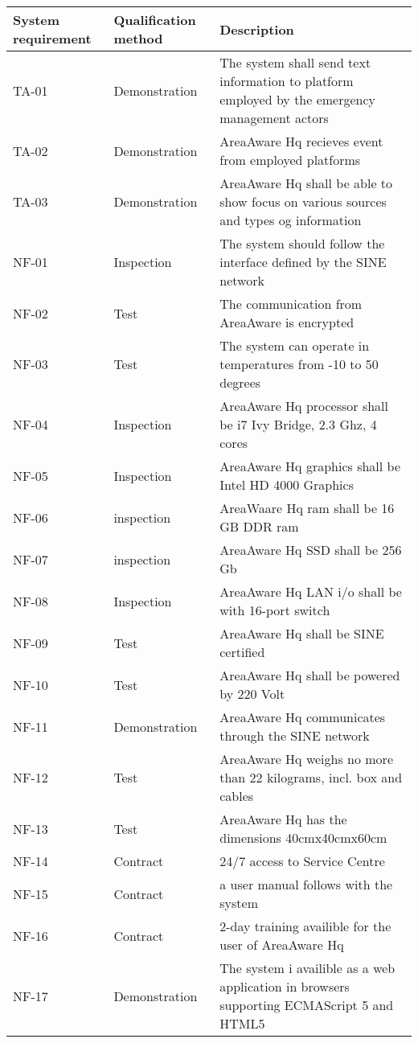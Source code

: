 \begin{longtable}{| p{2.4cm}  | p{2.6cm} | p{6.6cm} |  }
	\hline
	\textbf{System requirement}	& \textbf{Qualification method} & \textbf{Description} \\ \hline
	TA-01	& Demonstration	& The system shall send text information to platform employed by the emergency management actors \\ \hline
	TA-02	& Demonstration	& AreaAware Hq recieves event  from employed platforms \\ \hline
	TA-03	& Demonstration	& AreaAware Hq shall be able to show focus on various sources and types og information \\ \hline
	NF-01	& Inspection	& The system should follow the interface defined by the SINE network \\ \hline
	NF-02	& Test			& The communication from AreaAware is encrypted  \\ \hline
	NF-03	& Test			& The system can operate in temperatures from -10 to 50 degrees \\ \hline
	NF-04	& Inspection	& AreaAware Hq processor shall be i7 Ivy Bridge, 2.3 Ghz, 4 cores \\ \hline
	NF-05	& Inspection	& AreaAware Hq graphics shall be Intel HD 4000 Graphics \\ \hline
	NF-06	& inspection	& AreaWaare Hq ram shall be 16 GB DDR ram \\ \hline
	NF-07	& inspection	& AreaAware Hq SSD shall be 256 Gb \\ \hline
	NF-08	& Inspection	& AreaAware Hq LAN i/o shall be with 16-port switch \\ \hline
	NF-09	& Test			& AreaAware Hq shall be SINE certified \\ \hline
	NF-10	& Test			& AreaAware Hq shall be powered by 220 Volt \\ \hline
	NF-11	& Demonstration	& AreaAware Hq communicates through the SINE network \\ \hline
	NF-12	& Test			& AreaAware Hq  weighs no more than 22 kilograms, incl. box and cables\\ \hline
	NF-13	& Test			& AreaAware Hq has the dimensions 40cmx40cmx60cm\\ \hline
	NF-14	& Contract		& 24/7 access to Service Centre\\ \hline
	NF-15	& Contract		& a user manual follows with the system\\ \hline
	NF-16	& Contract		& 2-day training availible for the user of AreaAware Hq \\ \hline
	NF-17	& Demonstration	& The system i availible as a web application in browsers supporting ECMAScript 5 and HTML5\\ \hline
	
\end{longtable}